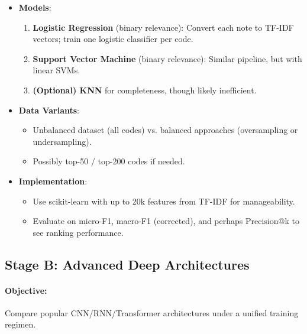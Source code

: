 \documentclass[12pt,a4paper]{report}
\begin{document}
\begin{itemize}
    \item \textbf{Models}:
    \begin{enumerate}
        \item \textbf{Logistic Regression} (binary relevance): Convert each note to TF-IDF vectors; train one logistic classifier per code.
        \item \textbf{Support Vector Machine} (binary relevance): Similar pipeline, but with linear SVMs.
        \item \textbf{(Optional) KNN} for completeness, though likely inefficient.
    \end{enumerate}
    \item \textbf{Data Variants}:
    \begin{itemize}
        \item Unbalanced dataset (all codes) vs. balanced approaches (oversampling or undersampling).
        \item Possibly top-50 / top-200 codes if needed.
    \end{itemize}
    \item \textbf{Implementation}:
    \begin{itemize}
        \item Use scikit-learn with up to 20k features from TF-IDF for manageability.
        \item Evaluate on micro-F1, macro-F1 (corrected), and perhaps Precision@k to see ranking performance.
    \end{itemize}
\end{itemize}


\subsection{Stage B: Advanced Deep Architectures}
\paragraph{Objective:} Compare popular CNN/RNN/Transformer architectures under a unified training regimen.
\end{document}
